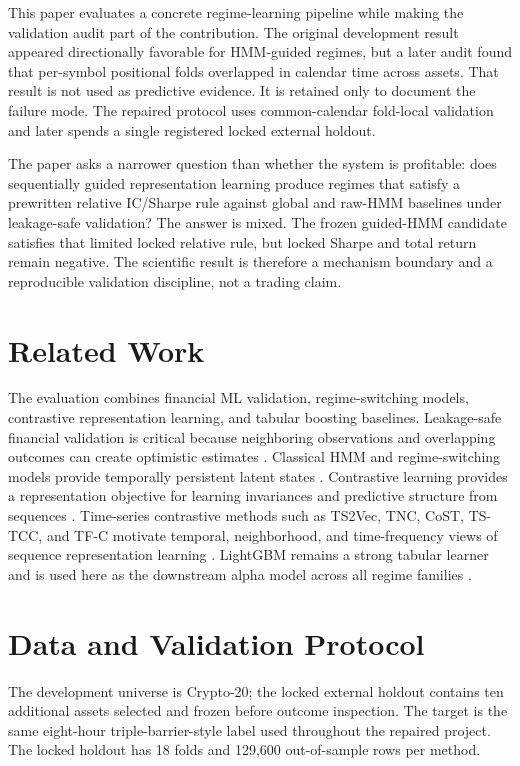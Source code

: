 \documentclass[sigconf,anonymous,review]{acmart}
\begin{document}
This paper evaluates a concrete regime-learning pipeline while making the validation audit part of the contribution. The original development result appeared directionally favorable for HMM-guided regimes, but a later audit found that per-symbol positional folds overlapped in calendar time across assets. That result is not used as predictive evidence. It is retained only to document the failure mode. The repaired protocol uses common-calendar fold-local validation and later spends a single registered locked external holdout.

The paper asks a narrower question than whether the system is profitable: does sequentially guided representation learning produce regimes that satisfy a prewritten relative IC/Sharpe rule against global and raw-HMM baselines under leakage-safe validation? The answer is mixed. The frozen guided-HMM candidate satisfies that limited locked relative rule, but locked Sharpe and total return remain negative. The scientific result is therefore a mechanism boundary and a reproducible validation discipline, not a trading claim.

\section{Related Work}
The evaluation combines financial ML validation, regime-switching models, contrastive representation learning, and tabular boosting baselines. Leakage-safe financial validation is critical because neighboring observations and overlapping outcomes can create optimistic estimates \cite{lopezdeprado2018afml}. Classical HMM and regime-switching models provide temporally persistent latent states \cite{hamilton1989regime,rabiner1989hmm}. Contrastive learning provides a representation objective for learning invariances and predictive structure from sequences \cite{oord2018cpc,chen2020simclr}. Time-series contrastive methods such as TS2Vec, TNC, CoST, TS-TCC, and TF-C motivate temporal, neighborhood, and time-frequency views of sequence representation learning \cite{ts2vec2022,tnc2021,cost2022,tstcc2021,tfc2022}. LightGBM remains a strong tabular learner and is used here as the downstream alpha model across all regime families \cite{lightgbm2017}.

\section{Data and Validation Protocol}
The development universe is Crypto-20; the locked external holdout contains ten additional assets selected and frozen before outcome inspection. The target is the same eight-hour triple-barrier-style label used throughout the repaired project. The locked holdout has 18 folds and 129,600 out-of-sample rows per method.
\end{document}
